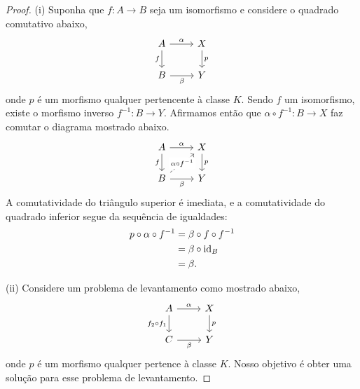 \begin{proof}
  (i) Suponha que $f: A \to B$ seja um isomorfismo e considere o quadrado comutativo abaixo,
  \begin{displaymath}
    \begin{tikzcd}
      A
      \arrow[r, "\alpha"]
      \arrow[d, "f" swap]
      & X
      \arrow[d, "p"]
      \\ B
      \arrow[r, "\beta" swap]
      & Y
    \end{tikzcd}
  \end{displaymath}
  onde $p$ é um morfismo qualquer pertencente à classe $K$.
  Sendo $f$ um isomorfismo, existe o morfismo inverso $f^{-1}: B \to Y$.
  Afirmamos então que $\alpha \circ f^{-1}: B \to X$ faz comutar o diagrama mostrado abaixo.
  \begin{displaymath}
    \begin{tikzcd}
      A
      \arrow[r, "\alpha"]
      \arrow[d, "f" swap]
      & X
      \arrow[d, "p"]
      \\ B
      \arrow[r, "\beta" swap]
      \arrow[ru, dashed, "\alpha \circ f^{-1}" description]
      & Y
    \end{tikzcd}
  \end{displaymath}
  A comutatividade do triângulo superior é imediata, e a comutatividade do quadrado inferior segue da sequência de igualdades:
  \begin{align*}
    p \circ \alpha \circ f^{-1}
    & = \beta \circ f \circ f^{-1} \\
    & = \beta \circ \mathrm{id}_B \\
    & = \beta.
  \end{align*}

  \smallskip
  (ii) Considere um problema de levantamento como mostrado abaixo,
  \begin{equation}\label{eq:comp_K-proj_diag_1}
    \begin{tikzcd}
      A
      \arrow[r, "\alpha"]
      \arrow[d, "f_2 \circ f_1" swap]
      & X
      \arrow[d, "p"]
      \\ C
      \arrow[r, "\beta" swap]
      & Y
    \end{tikzcd}
  \end{equation}
  onde $p$ é um morfismo qualquer pertence à classe $K$.
  Nosso objetivo é obter uma solução para esse problema de levantamento.


\end{proof}
